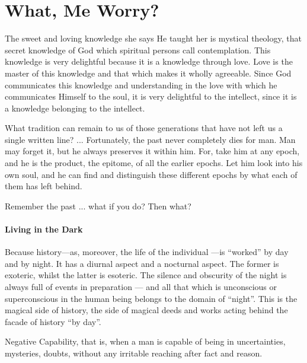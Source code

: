 \section{What, Me Worry?}

\begin{quotex}
The sweet and loving knowledge she says He taught her is mystical theology, that secret knowledge of God which spiritual persons call contemplation. This knowledge is very delightful because it is a knowledge through love. Love is the master of this knowledge and that which makes it wholly agreeable. Since God communicates this knowledge and understanding in the love with which he communicates Himself to the soul, it is very delightful to the intellect, since it is a knowledge belonging to the intellect.

What tradition can remain to us of those generations that have not left us a single written line? ... Fortunately, the past never completely dies for man. Man may forget it, but he always preserves it within him. For, take him at any epoch, and he is the product, the epitome, of all the earlier epochs. Let him look into his own soul, and he can find and distinguish these different epochs by what each of them has left behind.
\end{quotex}


Remember the past ... what if you do? Then what?

\paragraph{Living in the Dark}


\begin{quotex}
Because history---as, moreover, the life of the individual ---is ``worked'' by day and by night. It has a diurnal aspect and a nocturnal aspect. The former is exoteric, whilst the latter is esoteric. The silence and obscurity of the night is always full of events in preparation --- and all that which is unconscious or superconscious in the human being belongs to the domain of ``night''. This is the magical side of history, the side of magical deeds and works acting behind the facade of history ``by day''.

Negative Capability, that is, when a man is capable of being in uncertainties, mysteries, doubts, without any irritable reaching after fact and reason.
\end{quotex}


